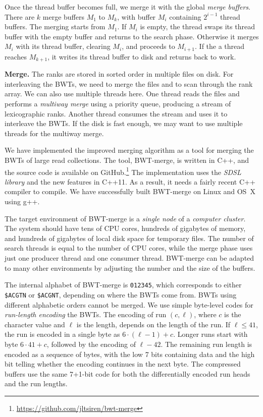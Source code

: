 \documentclass[smallabstract,smallcaptions]{dccpaper}
\newcommand{\BWT}{\textsf{BWT}}
\newcommand{\BWTmerge}{\textsf{BWT\nobreakdash-merge}}
\begin{document}
Once the thread buffer becomes full, we merge it with the global \emph{merge buffers}. There are $k$ merge buffers $M_{1}$ to $M_{k}$, with buffer $M_{i}$ containing $2^{i-1}$ thread buffers. The merging starts from $M_{1}$. If $M_{i}$ is empty, the thread swaps its thread buffer with the empty buffer and returns to the search phase. Otherwise it merges $M_{i}$ with its thread buffer, clearing $M_{i}$, and proceeds to $M_{i+1}$. If the a thread reaches $M_{k+1}$, it writes its thread buffer to disk and returns back to work.

\smallbreak\noindent\textbf{Merge.} The ranks are stored in sorted order in multiple files on disk. For interleaving the \BWT{}s, we need to merge the files and to scan through the rank array. We can also use multiple threads here. One thread reads the files and performs a \emph{multiway merge} using a priority queue, producing a stream of lexicographic ranks. Another thread consumes the stream and uses it to interleave the \BWT{}s. If the disk is fast enough, we may want to use multiple threads for the multiway merge.



We have implemented the improved merging algorithm as a tool for merging the \BWT{}s of large read collections. The tool, \BWTmerge{}, is written in C++, and the source code is available on GitHub.\footnote{\url{https://github.com/jltsiren/bwt-merge}} The implementation uses the \emph{SDSL library} \cite{Gog2014b} and the new features in C++11. As a result, it needs a fairly recent C++ compiler to compile. We have successfully built \BWTmerge{} on Linux and OS~X using g++.

The target environment of \BWTmerge{} is a \emph{single node} of a \emph{computer cluster}. The system should have tens of CPU cores, hundreds of gigabytes of memory, and hundreds of gigabytes of local disk space for temporary files. The number of search threads is equal to the number of CPU cores, while the merge phase uses just one producer thread and one consumer thread. \BWTmerge{} can be adapted to many other environments by adjusting the number and the size of the buffers.

The internal alphabet of \BWTmerge{} is \texttt{012345}, which corresponds to either \texttt{\$ACGTN} or \texttt{\$ACGNT}, depending on where the \BWT{}s come from. \BWT{}s using different alphabetic orders cannot be merged. We use simple byte-level codes for \emph{run-length encoding} the \BWT{}s. The encoding of run $(c, \ell)$, where $c$ is the character value and $\ell$ is the length, depends on the length of the run. If $\ell \le 41$, the run is encoded in a single byte as $6 \cdot (\ell-1) + c$. Longer runs start with byte $6 \cdot 41 + c$, followed by the encoding of $\ell-42$. The remaining run length is encoded as a sequence of bytes, with the low 7 bits containing data and the high bit telling whether the encoding continues in the next byte. The compressed buffers use the same 7+1\nobreakdash-bit code for both the differentially encoded run heads and the run lengths.
\end{document}
